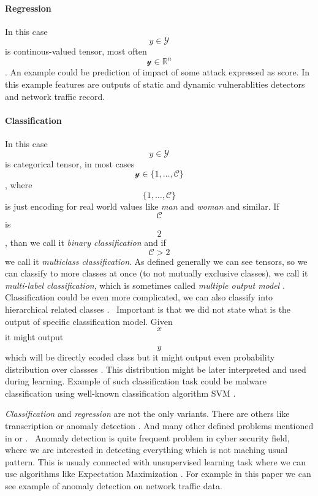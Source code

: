 \paragraph{Regression}
In this case $$y \in \mathcal{Y}$$ is continous-valued tensor, most often $$\mathcal{y} \in \mathbb{R}^{n}$$. An example could be prediction of impact of some attack expressed as score. In this example features are outputs of static and dynamic vulnerablities detectors and network traffic record. \cite{Jaganathan2015}

\paragraph{Classification}
In this case $$y \in \mathcal{Y}$$ is categorical tensor, in most cases $$\mathcal{y} \in \{1,\dots,\mathcal{C}\}$$, where $$\{1,\dots,\mathcal{C}\}$$ is just encoding for real world values like \emph{man} and \emph{woman} and similar. If $$\mathcal{C}$$ is $$2$$, than we call it \emph{binary classification} and if $$\mathcal{C}>2$$ we call it \emph{multiclass classification}. As defined generally we can see tensors, so we can classify to more classes at once (to not mutually exclusive classes), we call it \emph{multi-label classification}, which is sometimes called \emph{multiple output model} \cite{murphy2013machine}. Classification could be even more complicated, we can also classify into hierarchical related classes \cite{zhang2020dive}. \
Important is that we did not state what is the output of specific classification model. Given $$x$$ it might output $$\hat{y}$$ which will be directly ecoded class but it might output even probability distribution over classses \cite{GoodBengCour16}. This distribution might be later interpreted and used during learning.
Example of such classification task could be malware classification using well-known classification algorithm SVM \cite{Kruczkowski2014}.


\emph{Classification} and \emph{regression} are not the only variants. There are others like transcription \cite{GoodBengCour16} or anomaly detection \cite{Chandola2009}. And many other defined problems mentioned in \cite{GoodBengCour16} or \cite{zhang2020dive}. \
Anomaly detection is quite frequent problem in cyber security field, where we are interested in detecting everything which is not maching usual pattern. This is usualy connected with unsupervised learning task where we can use algorithms like Expectation Maximization \cite{Dempster1977}. For example in this paper \cite{IglesiasVazquez2014} we can see example of anomaly detection on network traffic data.

